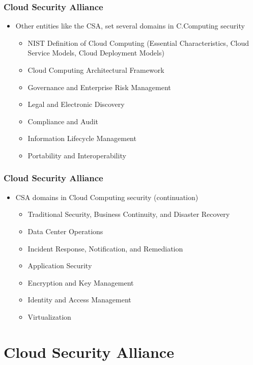 \documentclass{beamer}
\begin{document}
\begin{frame}
\frametitle{Cloud Security Alliance}
\begin{itemize}
  \item Other entities like the CSA, set several domains in C.Computing security
    \begin{itemize}
    \item NIST Definition of Cloud Computing (Essential Characteristics, Cloud Service Models, Cloud Deployment Models) 
    \item Cloud Computing Architectural Framework
    \item Governance and Enterprise Risk Management
    \item Legal and Electronic Discovery
    \item Compliance and Audit
    \item Information Lifecycle Management
    \item Portability and Interoperability
    \end{itemize}
\end{itemize}
\end{frame}


\begin{frame}
\frametitle{Cloud Security Alliance}
\begin{itemize}
  \item CSA domains in Cloud Computing security (continuation)
    \begin{itemize}
    \item Traditional Security, Business Continuity, and Disaster Recovery
    \item Data Center Operations
    \item Incident Response, Notification, and Remediation
    \item Application Security
    \item Encryption and Key Management
    \item Identity and Access Management
    \item Virtualization
    \end{itemize}
\end{itemize}
\end{frame}

\section{Cloud Security Alliance}
\end{document}

